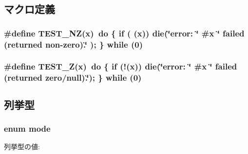 \subsection{マクロ定義}
\hypertarget{rdma-common_8h_a6f9c312997bf9d056f521b73c4d74b75}{
\subsubsection[{TEST\_\-NZ}]{\setlength{\rightskip}{0pt plus 5cm}\#define TEST\_\-NZ(x)~do \{ if ( (x)) die(\char`\"{}error: \char`\"{} \#x \char`\"{} failed (returned non-\/zero).\char`\"{} ); \} while (0)}}
\label{rdma-common_8h_a6f9c312997bf9d056f521b73c4d74b75}
\hypertarget{rdma-common_8h_aaddb23fe07ec45e6fdcc24f53c8196df}{
\subsubsection[{TEST\_\-Z}]{\setlength{\rightskip}{0pt plus 5cm}\#define TEST\_\-Z(x)~do \{ if (!(x)) die(\char`\"{}error: \char`\"{} \#x \char`\"{} failed (returned zero/null).\char`\"{}); \} while (0)}}
\label{rdma-common_8h_aaddb23fe07ec45e6fdcc24f53c8196df}


\subsection{列挙型}
\hypertarget{rdma-common_8h_a1a6b6fb557d8d37d59700faf4e4c9167}{
\subsubsection[{mode}]{\setlength{\rightskip}{0pt plus 5cm}enum {\bf mode}}}
\label{rdma-common_8h_a1a6b6fb557d8d37d59700faf4e4c9167}
\begin{Desc}
\item[列挙型の値: ]\par
\begin{description}
\item[{\em 
\hypertarget{rdma-common_8h_a1a6b6fb557d8d37d59700faf4e4c9167a7af369c035a45a9babde5a9443b5ef01}{
M\_\-WRITE}
\label{rdma-common_8h_a1a6b6fb557d8d37d59700faf4e4c9167a7af369c035a45a9babde5a9443b5ef01}
}]\item[{\em 
\hypertarget{rdma-common_8h_a1a6b6fb557d8d37d59700faf4e4c9167a0cb0be5475011ea9319ce55b30e74634}{
M\_\-READ}
\label{rdma-common_8h_a1a6b6fb557d8d37d59700faf4e4c9167a0cb0be5475011ea9319ce55b30e74634}
}]\end{description}
\end{Desc}



